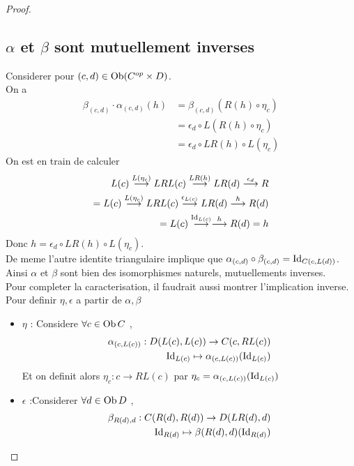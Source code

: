 \documentclass[../main.tex]{subfiles}
\begin{document}
\begin{proof}
\subsection*{$\alpha$ et $\beta$ sont mutuellement inverses}
Considerer pour $ ( c,d) \in \operatorname{Ob} ( C^{op}\times D) $.\\
On a 
\begin{align*}
	\beta_{( c,d) } \cdot \alpha_{ ( c,d) } ( h) &= \beta_{ ( c,d) } ( R( h) \circ \eta_c)  \\
						     &= \epsilon_d\circ L( R( h) \circ \eta_c) \\
						     &= \epsilon_d\circ LR( h) \circ L( \eta_c )
\end{align*}
On est en train de calculer
\begin{align*}
L( c) \overset{ L( \eta_c) }{\longrightarrow} LRL( c) \overset{ LR( h) }{\longrightarrow} LR( d) \overset{ \epsilon_d}{\longrightarrow} R\\
= L( c) \overset{ L( \eta_c) }{\longrightarrow} LRL( c) \overset{ \epsilon_{L( c) }  }{\longrightarrow} LR( d) \overset{h}{\longrightarrow} R( d) \\
= L( c) \overset{ \operatorname{Id}_{L( c) } }{\longrightarrow} \overset{ h}{\longrightarrow} R( d) =h
\end{align*}
Donc $h= \epsilon_d\circ LR( h) \circ L( \eta_c) $.\\
De meme l'autre identite triangulaire implique que $\alpha_{ ( c,d) } \circ \beta_{( c,d) } = \operatorname{Id}_{C( c,L( d) ) } $.\\
Ainsi $\alpha$ et $\beta$ sont bien des isomorphismes naturels, mutuellements inverses.\\
\hr
Pour completer la caracterisation, il faudrait aussi montrer l'implication inverse.\\
Pour definir $\eta,\epsilon$ a partir de $\alpha,\beta$ 
\begin{itemize}
\item $\eta$ : Considere $\forall c \in \operatorname{Ob} C$ ,
	\begin{align*}
	\alpha_{ ( c,L( c) )  } : D( L( c) ,L( c) ) \to C( c,RL( c) ) \\
	\operatorname{Id}_{L( c) } \mapsto \alpha_{( c,L( c) ) } ( \operatorname{Id}_{L( c) } ) 
	\end{align*}
	Et on definit alors $\eta_c: c \to RL( c) $ par $\eta_c = \alpha_{ ( c,L( c) ) } ( \operatorname{Id}_{L( c) } ) $ 				
	
\item $\epsilon$ :Considerer $\forall d \in \operatorname{Ob} D$ ,
	\begin{align*}
		\beta_{ R( d) ,d} : C( R( d) ,R( d) ) \to D( LR( d) ,d) \\
		\operatorname{Id}_{R( d) } \mapsto \beta( R( d) ,d) ( \operatorname{Id}_{R( d) } ) 	
	\end{align*}
		
\end{itemize}
			



				
\end{proof}

			



			
\end{document}
